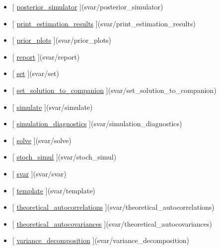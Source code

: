 \documentclass[letterpaper,10pt,english]{sphinxmanual}
\begin{document}
\begin{itemize}
\item {} 
{[} {\hyperref[classes/models/@svar/svar:posterior-simulator]{posterior\_simulator}} {]}(svar/posterior\_simulator)

\item {} 
{[} {\hyperref[classes/models/@svar/svar:print-estimation-results]{print\_estimation\_results}} {]}(svar/print\_estimation\_results)

\item {} 
{[} {\hyperref[classes/models/@svar/svar:prior-plots]{prior\_plots}} {]}(svar/prior\_plots)

\item {} 
{[} {\hyperref[classes/models/@svar/svar:report]{report}} {]}(svar/report)

\item {} 
{[} {\hyperref[classes/models/@svar/svar:set]{set}} {]}(svar/set)

\item {} 
{[} {\hyperref[classes/models/@svar/svar:set-solution-to-companion]{set\_solution\_to\_companion}} {]}(svar/set\_solution\_to\_companion)

\item {} 
{[} {\hyperref[classes/models/@svar/svar:simulate]{simulate}} {]}(svar/simulate)

\item {} 
{[} {\hyperref[classes/models/@svar/svar:simulation-diagnostics]{simulation\_diagnostics}} {]}(svar/simulation\_diagnostics)

\item {} 
{[} {\hyperref[classes/models/@svar/svar:solve]{solve}} {]}(svar/solve)

\item {} 
{[} {\hyperref[classes/models/@svar/svar:stoch-simul]{stoch\_simul}} {]}(svar/stoch\_simul)

\item {} 
{[} {\hyperref[classes/models/@svar/svar:svar]{svar}} {]}(svar/svar)

\item {} 
{[} {\hyperref[classes/models/@svar/svar:template]{template}} {]}(svar/template)

\item {} 
{[} {\hyperref[classes/models/@svar/svar:theoretical-autocorrelations]{theoretical\_autocorrelations}} {]}(svar/theoretical\_autocorrelations)

\item {} 
{[} {\hyperref[classes/models/@svar/svar:theoretical-autocovariances]{theoretical\_autocovariances}} {]}(svar/theoretical\_autocovariances)

\item {} 
{[} {\hyperref[classes/models/@svar/svar:variance-decomposition]{variance\_decomposition}} {]}(svar/variance\_decomposition)

\end{itemize}
\end{document}
